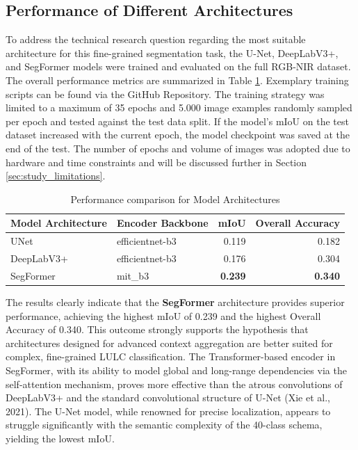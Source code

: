 \documentclass{report}
\begin{document}
\subsection{Performance of Different Architectures}
To address the technical research question regarding the most suitable architecture for this fine-grained segmentation task, the U-Net, DeepLabV3+, and SegFormer models were trained and evaluated on the full RGB-NIR dataset. The overall performance metrics are summarized in Table \ref{tab:performance_model_architectures}. Exemplary training scripts can be found via the GitHub Repository. The training strategy was limited to a maximum of 35 epochs and 5.000 image examples randomly sampled per epoch and tested against the test data split. If the model's mIoU on the test dataset increased with the current epoch, the model checkpoint was saved at the end of the test. The number of epochs and volume of images was adopted due to hardware and time constraints and will be discussed further in Section \ref{sec:study_limitations}. \par
\begin{table}[H]
\centering
\caption{Performance comparison for Model Architectures}
\label{tab:performance_model_architectures}
\begin{tabular}{llrr}
\toprule
Model Architecture & Encoder Backbone & mIoU & Overall Accuracy \\
\midrule
UNet & efficientnet-b3 & 0.119 & 0.182 \\
DeepLabV3+ & efficientnet-b3 & 0.176 & 0.304 \\
SegFormer & mit\_b3 & \textbf{0.239} & \textbf{0.340} \\
\bottomrule
\end{tabular}
\end{table}
The results clearly indicate that the \textbf{SegFormer} architecture provides superior performance, achieving the highest mIoU of 0.239 and the highest Overall Accuracy of 0.340. This outcome strongly supports the hypothesis that architectures designed for advanced context aggregation are better suited for complex, fine-grained LULC classification. The Transformer-based encoder in SegFormer, with its ability to model global and long-range dependencies via the self-attention mechanism, proves more effective than the atrous convolutions of DeepLabV3+ and the standard convolutional structure of U-Net (Xie et al., 2021). The U-Net model, while renowned for precise localization, appears to struggle significantly with the semantic complexity of the 40-class schema, yielding the lowest mIoU. \par
\end{document}
